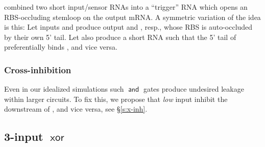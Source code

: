 \documentclass[12pt,notitlepage]{article}
\newcommand{\TODO}[1]{\textrm{\color{red}TODO: #1}}
\newcommand{\AND}{\ensuremath{\mathop{\mathsf{and}}}\xspace}
\newcommand{\XOR}{\ensuremath{\mathop{\mathsf{xor}}}\xspace}
\begin{document}
\cite[\href{https://www.nature.com/articles/nature23271/figures/2}{Fig.~2e}]{GreenETAL2017}
combined
two short input/sensor RNAs
into a ``trigger'' RNA
which opens an RBS-occluding stemloop
on the output mRNA.
%
%
A symmetric variation of the idea is this:
%
Let inputs  and  
produce
output  and , resp.,
whose RBS is auto-occluded
by their own 5' tail.
%
Let  
also produce a short RNA
such that
the 5' tail of  preferentially binds ,
and vice versa.


\subsubsection*{Cross-inhibition} \label{ss:xinh}

Even in our idealized simulations
such \AND gates produce undesired leakage
within larger circuits.
%
%
%
To fix this, we propose that
\emph{low} input  
{inhibit} the downstream of ,
and vice versa,
see \S\ref{s:x-inh}.



%


\subsection{3-input \texorpdfstring{\XOR}{XOR}} \label{ss:3xor}
\end{document}
